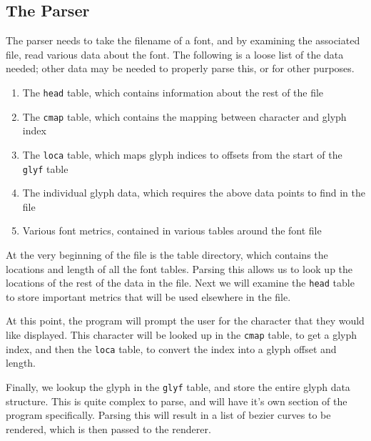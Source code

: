 \documentclass{report}
\begin{document}

\subsection{The Parser}
The parser needs to take the filename of a font, and by examining the associated
file, read various data about the font. The following is a loose list of the
data needed; other data may be needed to properly parse this, or for other
purposes.

\begin{enumerate}
  \item{The \texttt{head} table, which contains information about the rest of
      the file}
  \item{The \texttt{cmap} table, which contains the mapping between character
      and glyph index}
  \item{The \texttt{loca} table, which maps glyph indices to offsets from the
      start of the \texttt{glyf} table}
  \item{The individual glyph data, which requires the above data points to
      find in the file}
  \item{Various font metrics, contained in various tables around the font file}
\end{enumerate}

At the very beginning of the file is the table directory, which contains the
locations and length of all the font tables. Parsing this allows us to look up
the locations of the rest of the data in the file. Next we will examine the
\texttt{head} table to store important metrics that will be used elsewhere in
the file.

At this point, the program will prompt the user for the character that they
would like displayed. This character will be looked up in the \texttt{cmap}
table, to get a glyph index, and then the \texttt{loca} table, to convert the
index into a glyph offset and length.

Finally, we lookup the glyph in the \texttt{glyf} table, and store the entire
glyph data structure. This is quite complex to parse, and will have it's own
section of the program specifically. Parsing this will result in a list of
bezier curves to be rendered, which is then passed to the renderer. 
\end{document}
